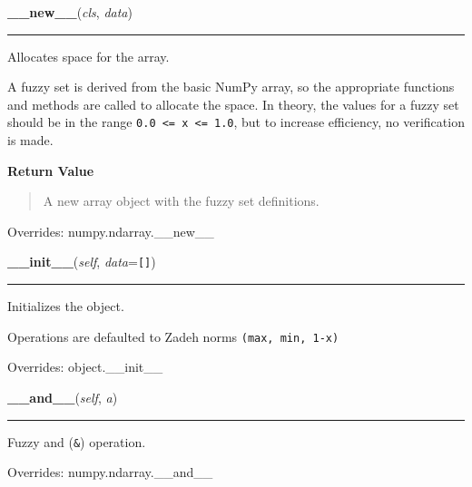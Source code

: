     \begin{boxedminipage}{\textwidth}

    \raggedright \textbf{\_\_new\_\_}(\textit{cls}, \textit{data})

    \vspace{-1.5ex}

    \rule{\textwidth}{0.5\fboxrule}

Allocates space for the array.

A fuzzy set is derived from the basic NumPy array, so the appropriate
functions and methods are called to allocate the space. In theory, the
values for a fuzzy set should be in the range \texttt{0.0 <= x <= 1.0}, but
to increase efficiency, no verification is made.
    \vspace{1ex}

      \textbf{Return Value}
      \begin{quote}

A new array object with the fuzzy set definitions.
      \end{quote}

    \vspace{1ex}

      Overrides: numpy.ndarray.\_\_new\_\_

    \end{boxedminipage}

    \vspace{0.5ex}

    \begin{boxedminipage}{\textwidth}

    \raggedright \textbf{\_\_init\_\_}(\textit{self}, \textit{data}=\texttt{\texttt{[}\texttt{]}})

    \vspace{-1.5ex}

    \rule{\textwidth}{0.5\fboxrule}

Initializes the object.

Operations are defaulted to Zadeh norms \texttt{(max, min, 1-x)}
    \vspace{1ex}

      Overrides: object.\_\_init\_\_

    \end{boxedminipage}

    \vspace{0.5ex}

    \begin{boxedminipage}{\textwidth}

    \raggedright \textbf{\_\_and\_\_}(\textit{self}, \textit{a})

    \vspace{-1.5ex}

    \rule{\textwidth}{0.5\fboxrule}

Fuzzy and (\texttt{{\&}}) operation.
    \vspace{1ex}

      Overrides: numpy.ndarray.\_\_and\_\_

    \end{boxedminipage}

